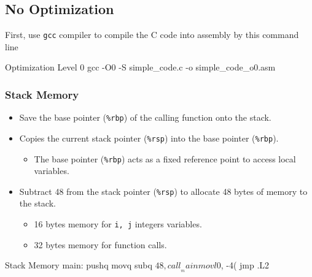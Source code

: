 \documentclass[12pt, a4paper]{article}
\begin{document}
	\pagebreak

        \subsection{No Optimization}
            First, use \texttt{gcc} compiler to compile the C code into assembly by this command line
            \begin{codeblock}[minted language=bat]{Optimization Level 0}
                gcc -O0 -S simple_code.c -o simple_code_o0.asm
            \end{codeblock}

            \subsubsection{Stack Memory}
                \begin{itemize}
                    \item Save the base pointer (\texttt{\%rbp}) of the calling function onto the stack.
                    \item Copies the current stack pointer (\texttt{\%rsp}) into the base pointer (\texttt{\%rbp}).
                    \begin{itemize}
                        \item The base pointer (\texttt{\%rbp}) acts as a fixed reference point to access local variables.
                    \end{itemize}
                    \item Subtract 48 from the stack pointer (\texttt{\%rsp}) to allocate 48 bytes of memory to the stack.
                    \begin{itemize}
                        \item 16 bytes memory for \texttt{i, j} integers variables.
                        \item 32 bytes memory for function calls.
                    \end{itemize}
                \end{itemize}
                \begin{codeblock}[minted language=asm]{Stack Memory}
                    main:
                        pushq   %
                        movq    %
                        subq    $48, %
                        call    __main
                        movl    $0, -4(%
                        jmp	.L2
                \end{codeblock}
\end{document}
